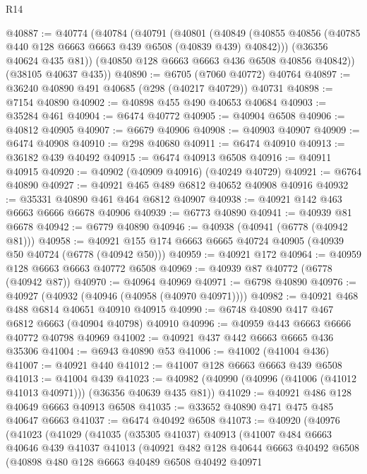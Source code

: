 \begin{lexlean}{R14}
\begin{coremodule}
@40887 := @40774
    (@40784
      (@40791
        (@40801
          (@40849 (@40855 @40856 (@40785 @440 @128 @6663 @6663 @439 @6508 (@40839 @439) @40842)))
          (@36356 @40624 @435 @81))
        (@40850 @128 @6663 @6663 @436 @6508 @40856 @40842))
      (@38105 @40637 @435))
@40890 := @6705 (@7060 @40772) @40764
@40897 := @36240 @40890 @491 @40685 (@298 (@40217 @40729)) @40731
@40898 := @7154 @40890
@40902 := @40898 @455 @490 @40653 @40684
@40903 := @35284 @461
@40904 := @6474 @40772
@40905 := @40904 @6508
@40906 := @40812 @40905
@40907 := @6679 @40906
@40908 := @40903 @40907
@40909 := @6474 @40908
@40910 := @298 @40680
@40911 := @6474 @40910
@40913 := @36182 @439 @40492
@40915 := @6474 @40913 @6508
@40916 := @40911 @40915
@40920 := @40902 (@40909 @40916) (@40249 @40729)
@40921 := @6764 @40890
@40927 := @40921 @465 @489 @6812 @40652 @40908 @40916
@40932 := @35331 @40890 @461 @464 @6812 @40907
@40938 := @40921 @142 @463 @6663 @6666 @6678 @40906
@40939 := @6773 @40890
@40941 := @40939 @81 @6678
@40942 := @6779 @40890
@40946 := @40938 (@40941 (@6778 (@40942 @81)))
@40958 := @40921 @155 @174 @6663 @6665 @40724 @40905 (@40939 @50 @40724 (@6778 (@40942 @50)))
@40959 := @40921 @172
@40964 := @40959 @128 @6663 @6663 @40772 @6508
@40969 := @40939 @87 @40772 (@6778 (@40942 @87))
@40970 := @40964 @40969
@40971 := @6798 @40890
@40976 := @40927 (@40932 (@40946 (@40958 (@40970 @40971))))
@40982 := @40921 @468 @488 @6814 @40651 @40910 @40915
@40990 := @6748 @40890 @417 @467 @6812 @6663 (@40904 @40798) @40910
@40996 := @40959 @443 @6663 @6666 @40772 @40798 @40969
@41002 := @40921 @437 @442 @6663 @6665 @436 @35306
@41004 := @6943 @40890 @53
@41006 := @41002 (@41004 @436)
@41007 := @40921 @440
@41012 := @41007 @128 @6663 @6663 @439 @6508
@41013 := @41004 @439
@41023 := @40982 (@40990 (@40996 (@41006 (@41012 @41013 @40971))) (@36356 @40639 @435 @81))
@41029 := @40921 @486 @128 @40649 @6663 @40913 @6508
@41035 := @33652 @40890 @471 @475 @485 @40647 @6663
@41037 := @6474 @40492 @6508
@41073 := @40920
    (@40976
      (@41023
        (@41029
          (@41035
            (@35305 @41037)
            @40913
            (@41007
              @484
              @6663
              @40646
              @439
              @41037
              @41013
              (@40921
                @482
                @128
                @40644
                @6663
                @40492
                @6508
                (@40898
                  @480
                  @128
                  @6663
                  @40489
                  @6508
                  @40492
                  @40971

\end{coremodule}
\end{lexlean}
